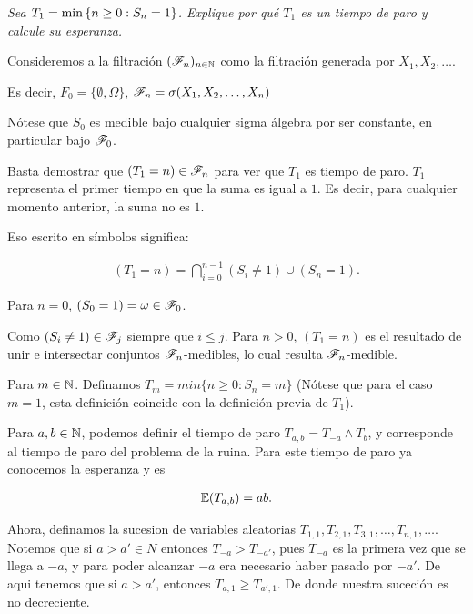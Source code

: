 \emph
{
	Sea $T_1=\min\left\{ n\geq 0:S_n=1\right\} $. Explique por qu\'e $T_1$ es un 
	tiempo de paro y calcule su esperanza.
}
\afterstatement

	Consideremos a la filtración $(\mathscr{F}_n)_{n\in\mathbb{N}}$ como la filtración 
	generada por $X_1, X_2, \dots$.\par\null\relax

	Es decir, $F_0 = \{\emptyset, \Omega\}$, $\mathscr{F}_n = \sigma(X_1, X_2, \dots, X_n)$\par\null

	Nótese que $S_0$ es medible bajo cualquier sigma álgebra por ser constante, en particular bajo
	$\mathscr{F}_0$.\par\null

	Basta demostrar que $(T_1 = n) \in \mathscr{F}_n$ para ver que $T_1$ es tiempo de paro. $T_1$ 
	representa el primer tiempo en que la suma es igual a $1$. Es decir, para cualquier 
	momento anterior, la suma no es $1$.\par\null

	Eso escrito en símbolos significa:

    \begin{align}
        (T_1 = n) = \bigcap_{i=0}^{n-1}(S_i \not= 1) \cup (S_n = 1).
    \end{align}\par\null

	Para $n=0$, $(S_0 = 1) = \omega \in \mathscr{F}_0$.\par\null

	Como $(S_i \not= 1) \in \mathscr{F}_j$ siempre que $i \leq j$. Para $n>0$, $(T_1 = n)$ es el resultado de 
	unir e intersectar conjuntos $\mathscr{F}_n$-medibles, lo cual resulta $\mathscr{F}_n$-medible.\par\null

	Para $m \in \mathbb{N}$. Definamos $T_m = min\{n \geq 0 : S_n = m\}$ 
	(Nótese que para el caso $m=1$, esta definición	coincide con la definición previa de $T_1$).\par\null
	
	Para $a,b \in \mathbb{N}$, podemos definir el tiempo de paro $T_{a,b} = T_{-a} \wedge T_b$, y 
	corresponde al 	tiempo de paro del problema de la ruina. Para este tiempo de paro ya conocemos 
	la esperanza y es
	
    \begin{align}
        \mathbb{E}(T_{a,b}) = ab.
    \end{align}\par\null
	
	Ahora, definamos la sucesion de variables aleatorias $T_{1,1}, T_{2,1}, T_{3,1}, \dots, T_{n,1}, 
	\dots$. Notemos que si $a>a' \in N$ entonces $T_{-a} > T_{-a'}$, pues $T_{-a}$ es la primera vez
	que se llega a $-a$, y para poder alcanzar $-a$ era necesario haber pasado por $-a'$.
	De aqui tenemos que si $a>a'$, entonces $T_{a,1} \geq T_{a',1}$. De donde nuestra suceción es 
	no decreciente.\par\null
	
